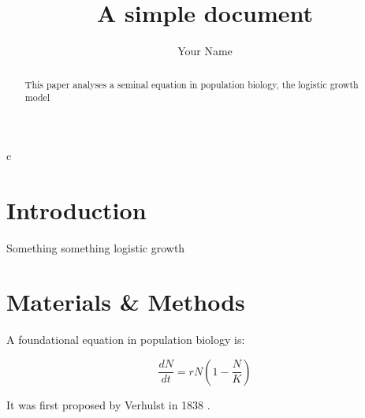 c \documentclass[12pt]{article}
\title{A simple document}
\author{Your Name}
\date{}
\begin{document}
    \maketitle

    \begin{abstract}
        This paper analyses a seminal equation in population biology, the logistic growth model
    \end{abstract}

    \section{Introduction}
        Something something logistic growth 
    
    \section{Materials \& Methods}

    A foundational equation in population biology is:

    \begin{equation}
        \frac{dN}{dt} = r N (1-\frac{N}{K})
    \end{equation}

    It was first proposed by Verhulst in 1838 \cite{verhulst1838notice}.

    

    
\end{document}
